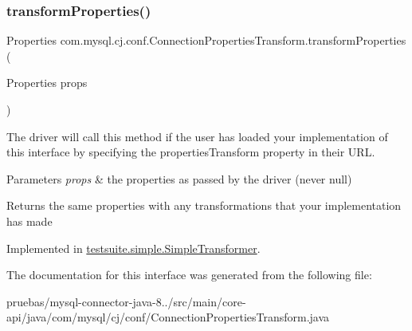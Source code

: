 \subsubsection{\texorpdfstring{transform\+Properties()}{transformProperties()}}
{\footnotesize\ttfamily Properties com.\+mysql.\+cj.\+conf.\+Connection\+Properties\+Transform.\+transform\+Properties (\begin{DoxyParamCaption}\item[{Properties}]{props }\end{DoxyParamCaption})}

The driver will call this method if the user has loaded your implementation of this interface by specifying the \textquotesingle{}properties\+Transform\textquotesingle{} property in their U\+RL.


\begin{DoxyParams}{Parameters}
{\em props} & the properties as passed by the driver (never null)\\
\hline
\end{DoxyParams}
\begin{DoxyReturn}{Returns}
the same properties with any transformations that your implementation has made 
\end{DoxyReturn}


Implemented in \mbox{\hyperlink{classtestsuite_1_1simple_1_1_simple_transformer_aadfc91d352f3a7b94257f30b319cb258}{testsuite.\+simple.\+Simple\+Transformer}}.



The documentation for this interface was generated from the following file\+:\begin{DoxyCompactItemize}
\item 
pruebas/mysql-\/connector-\/java-\/8../src/main/core-\/api/java/com/mysql/cj/conf/Connection\+Properties\+Transform.\+java\end{DoxyCompactItemize}
